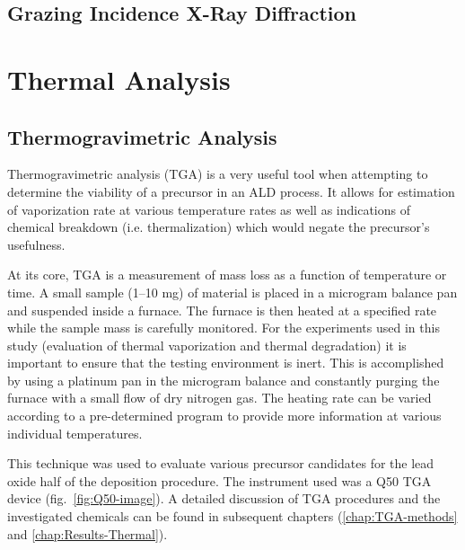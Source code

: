 \lipsum	


\subsection{Grazing Incidence X-Ray Diffraction}

\lipsum


\section{Thermal Analysis}


\subsection{Thermogravimetric Analysis}

Thermogravimetric analysis (TGA) is a very useful tool when attempting to determine the viability of a precursor in an ALD process. It allows for estimation of vaporization rate at various temperature rates as well as indications of chemical breakdown (i.e. thermalization) which would negate the precursor's usefulness. 

At its core, TGA is a measurement of mass loss as a function of temperature or time. A small sample (1--10 mg) of material is placed in a microgram balance pan and suspended inside a furnace. The furnace is then heated at a specified rate while the sample mass is carefully monitored. For the experiments used in this study (evaluation of thermal vaporization and thermal degradation) it is important to ensure that the testing environment is inert. This is accomplished by using a platinum pan in the microgram balance and constantly purging the furnace with a small flow of dry nitrogen gas. The heating rate can be varied according to a pre-determined program to provide more information at various individual temperatures. 

This technique was used to evaluate various precursor candidates for the lead oxide half of the \PTO deposition procedure. The instrument used was a Q50 TGA device (fig.~\ref{fig:Q50-image}).  A detailed discussion of TGA procedures and the investigated chemicals can be found in subsequent chapters (\ref{chap:TGA-methods} and \ref{chap:Results-Thermal}). 

